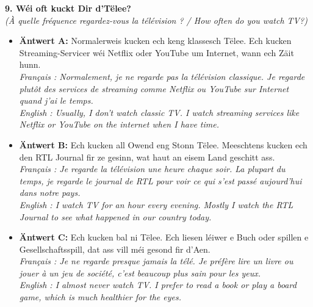 \noindent\textbf{9. Wéi oft kuckt Dir d’Tëlee?}\\
\textit{(À quelle fréquence regardez-vous la télévision ? / How often do you watch TV?)}
\begin{itemize}
    \item \textbf{Äntwert A:} Normalerweis kucken ech keng klassesch Tëlee. Ech kucken Streaming-Servicer wéi Netflix oder YouTube um Internet, wann ech Zäit hunn.\\
    \textit{Français : Normalement, je ne regarde pas la télévision classique. Je regarde plutôt des services de streaming comme Netflix ou YouTube sur Internet quand j'ai le temps.}\\
    \textit{English : Usually, I don't watch classic TV. I watch streaming services like Netflix or YouTube on the internet when I have time.}
    \item \textbf{Äntwert B:} Ech kucken all Owend eng Stonn Tëlee. Meeschtens kucken ech den RTL Journal fir ze gesinn, wat haut an eisem Land geschitt ass.\\
    \textit{Français : Je regarde la télévision une heure chaque soir. La plupart du temps, je regarde le journal de RTL pour voir ce qui s'est passé aujourd'hui dans notre pays.}\\
    \textit{English : I watch TV for an hour every evening. Mostly I watch the RTL Journal to see what happened in our country today.}
    \item \textbf{Äntwert C:} Ech kucken bal ni Tëlee. Ech liesen léiwer e Buch oder spillen e Gesellschaftsspill, dat ass vill méi gesond fir d'Aen.\\
    \textit{Français : Je ne regarde presque jamais la télé. Je préfère lire un livre ou jouer à un jeu de société, c'est beaucoup plus sain pour les yeux.}\\
    \textit{English : I almost never watch TV. I prefer to read a book or play a board game, which is much healthier for the eyes.}
\end{itemize}
\vspace{0.5em}

